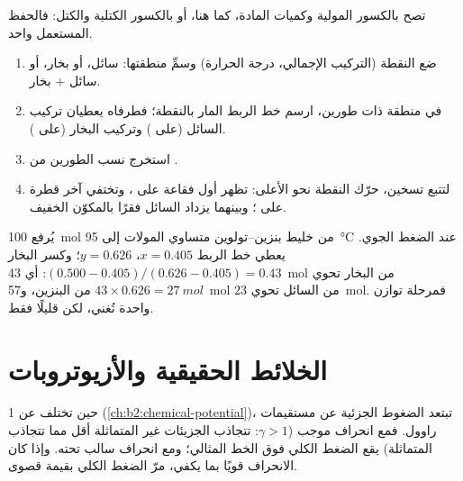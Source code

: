 تصح  بالكسور المولية وكميات المادة، كما هنا، أو بالكسور
الكتلية والكتل: فالحفظ المستعمل واحد.

\begin{method}\label{met:b2:liquid-vapour-diagrams:read-diagram}
\begin{enumerate}
  \item ضع النقطة (التركيب الإجمالي، درجة الحرارة) وسمِّ
        منطقتها: سائل، أو بخار، أو سائل + بخار.
  \item في منطقة ذات طورين، ارسم خط الربط المار بالنقطة؛ فطرفاه
        يعطيان تركيب السائل (على ) وتركيب
        البخار (على ).
  \item استخرج نسب الطورين من .
  \item لتتبع تسخين، حرّك النقطة نحو الأعلى: تظهر أول فقاعة
        على ، وتختفي آخر قطرة على ؛
        وبينهما يزداد السائل فقرًا بالمكوّن الخفيف.
\end{enumerate}
\end{method}

\begin{example}\label{ex:b2:liquid-vapour-diagrams:flash}
يُرفع \qty{100}{mol} من خليط بنزين--تولوين متساوي المولات إلى
\qty{95}{\degreeCelsius} عند الضغط الجوي. يعطي خط الربط $x =
0.405$، $y = 0.626$؛ وكسر البخار $(0.500 - 0.405)/(0.626 - 0.405) =
0.43$: أي \qty{43}{mol} من البخار تحوي $43 \times 0.626 = \qty{27}{mol}$ من
البنزين، و\qty{57}{mol} من السائل تحوي \qty{23}{mol}. فمرحلة توازن واحدة
تُغني، لكن قليلًا فقط.
\end{example}

\section{الخلائط الحقيقية والأزيوتروبات}

حين تختلف  عن 1 (\cref{ch:b2:chemical-potential})،
تبتعد الضغوط الجزئية عن مستقيمات راوول. فمع انحراف موجب
($\gamma > 1$: تتجاذب الجزيئات غير المتماثلة أقل مما تتجاذب
المتماثلة) يقع الضغط الكلي فوق الخط المثالي؛ ومع انحراف سالب
تحته. وإذا كان الانحراف قويًا بما يكفي، مرّ الضغط الكلي بقيمة
قصوى.


